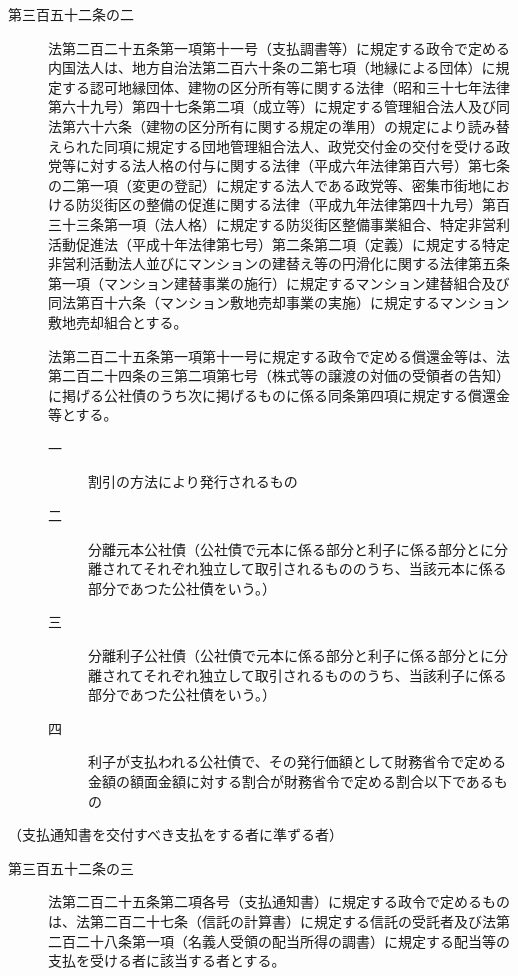 \documentclass[twocolumn,a4j,10pt]{ltjtarticle}
\begin{document}
\begin{description}
\item[第三百五十二条の二]法第二百二十五条第一項第十一号（支払調書等）に規定する政令で定める内国法人は、地方自治法第二百六十条の二第七項（地縁による団体）に規定する認可地縁団体、建物の区分所有等に関する法律（昭和三十七年法律第六十九号）第四十七条第二項（成立等）に規定する管理組合法人及び同法第六十六条（建物の区分所有に関する規定の準用）の規定により読み替えられた同項に規定する団地管理組合法人、政党交付金の交付を受ける政党等に対する法人格の付与に関する法律（平成六年法律第百六号）第七条の二第一項（変更の登記）に規定する法人である政党等、密集市街地における防災街区の整備の促進に関する法律（平成九年法律第四十九号）第百三十三条第一項（法人格）に規定する防災街区整備事業組合、特定非営利活動促進法（平成十年法律第七号）第二条第二項（定義）に規定する特定非営利活動法人並びにマンションの建替え等の円滑化に関する法律第五条第一項（マンション建替事業の施行）に規定するマンション建替組合及び同法第百十六条（マンション敷地売却事業の実施）に規定するマンション敷地売却組合とする。
\item[]法第二百二十五条第一項第十一号に規定する政令で定める償還金等は、法第二百二十四条の三第二項第七号（株式等の譲渡の対価の受領者の告知）に掲げる公社債のうち次に掲げるものに係る同条第四項に規定する償還金等とする。
\begin{description}
\item[一]割引の方法により発行されるもの
\item[二]分離元本公社債（公社債で元本に係る部分と利子に係る部分とに分離されてそれぞれ独立して取引されるもののうち、当該元本に係る部分であつた公社債をいう。）
\item[三]分離利子公社債（公社債で元本に係る部分と利子に係る部分とに分離されてそれぞれ独立して取引されるもののうち、当該利子に係る部分であつた公社債をいう。）
\item[四]利子が支払われる公社債で、その発行価額として財務省令で定める金額の額面金額に対する割合が財務省令で定める割合以下であるもの
\end{description}
\end{description}
\noindent\hspace{10pt}（支払通知書を交付すべき支払をする者に準ずる者）
\begin{description}
\item[第三百五十二条の三]法第二百二十五条第二項各号（支払通知書）に規定する政令で定めるものは、法第二百二十七条（信託の計算書）に規定する信託の受託者及び法第二百二十八条第一項（名義人受領の配当所得の調書）に規定する配当等の支払を受ける者に該当する者とする。
\end{description}
\end{document}
